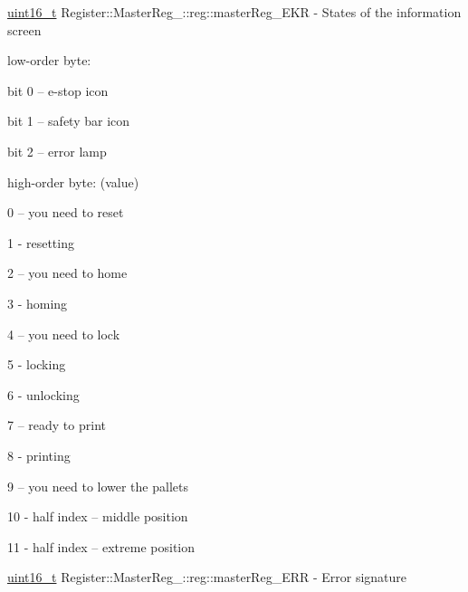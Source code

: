 \mbox{\label{structRegister_1_1MasterReg___1_1reg_aa5111a7f8eddbd8f8d6c92e23f326946}} 
{\footnotesize\ttfamily \mbox{\hyperlink{settings_8h_a017dd44e68049ffdd31500a8cd01ba68}{uint16\+\_\+t}} Register\+::\+Master\+Reg\+\_\+\+::reg\+::\texorpdfstring{master\+Reg\+\_\+\+E\+KR}{masterReg\_EKR}} - States of the information screen
\begin{DoxyCompactItemize}
\item low-order byte:
\begin{DoxyCompactItemize}
\item bit 0 – e-stop icon
\item bit 1 – safety bar icon
\item bit 2 – error lamp
\end{DoxyCompactItemize}
\item high-order byte: (value)
\begin{DoxyCompactItemize}
\item 0 – you need to reset
\item 1 - resetting
\item 2 – you need to home
\item 3 - homing
\item 4 – you need to lock
\item 5 - locking
\item 6 - unlocking
\item 7 – ready to print
\item 8 - printing
\item 9 – you need to lower the pallets
\item 10 - half index – middle position
\item 11 - half index – extreme position
\end{DoxyCompactItemize}
\end{DoxyCompactItemize}
\mbox{\label{structRegister_1_1MasterReg___1_1reg_a7be5288f63c9e6abe8970516b7ad8544}} 
{\footnotesize\ttfamily \mbox{\hyperlink{settings_8h_a017dd44e68049ffdd31500a8cd01ba68}{uint16\+\_\+t}} Register\+::\+Master\+Reg\+\_\+\+::reg\+::\texorpdfstring{master\+Reg\+\_\+\+E\+RR}{masterReg\_ERR}} - Error signature


